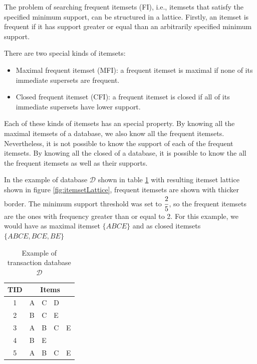 The problem of searching frequent itemsets (FI), i.e., itemsets that satisfy the specified minimum support, can be
structured in a lattice. Firstly, an itemset is frequent if it has support greater or equal than an arbitrarily
specified minimum support.


There are two special kinds of itemsets:
\begin{itemize}
 \item Maximal frequent itemset (MFI): a frequent itemset is maximal if none of its immediate supersets are frequent.
 \item Closed frequent itemset (CFI): a frequent itemset is closed if all of its immediate supersets have lower
support.
\end{itemize}

Each of these kinds of itemsets has an special property. By knowing all the maximal itemsets of a database, we
also know all the frequent itemsets. Nevertheless, it is not possible to know the support of each of the frequent
itemsets. By knowing all the closed of a database, it is possible to know the all the frequent itemsets as well as their
supports.

In the example of database $\mathcal{D}$ shown in table \ref{tb:itemsetLattice} with resulting itemset lattice shown in
figure \ref{fig:itemsetLattice}, frequent itemsets are shown with thicker border. The minimum support threshold was set
to $\cfrac{2}{5}$, so the frequent itemsets are the ones with frequency greater than or equal to 2. For this example, we
would have as maximal itemset $\{ABCE\}$ and as closed itemsets $\{ABCE, BCE, BE\}$

\begin{table}[h!]
  \begin{center}
    \label{tb:itemsetLattice}
      \begin{tabular}{ c | l l l l }
      \toprule
      \textbf{TID} & \multicolumn{4}{c}{\textbf{Items}} \\
      \midrule
	1	& A & C & D & \\
	2 	& B & C & E & \\
	3	& A & B & C & E \\
	4 	& B & E &   & \\
	5	& A & B & C & E \\
      \bottomrule
      \end{tabular}
  \caption{Example of transaction database $\mathcal{D}$ \cite{Pasquier99efficientmining}}
  \end{center}
\end{table}

